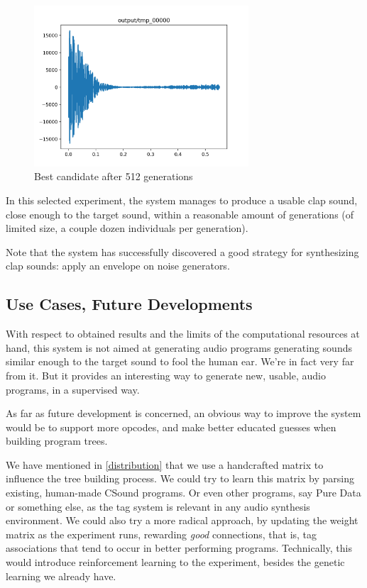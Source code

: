 \documentclass{article}
\begin{document}
\begin{figure}[H]
  \centering
  \includegraphics[width=8cm]{wav_clap_gen}
  \caption{Best candidate after 512 generations}
\end{figure}

In this selected experiment, the system manages to produce a usable clap sound, close enough to the target sound, within a reasonable amount of generations (of limited size, a couple dozen individuals per generation).

Note that the system has successfully discovered a good strategy for synthesizing clap sounds: apply an envelope on noise generators.

\subsection{Use Cases, Future Developments}

With respect to obtained results and the limits of the computational resources at hand, this system is not aimed at generating audio programs generating sounds similar enough to the target sound to fool the human ear. We're in fact very far from it. But it provides an interesting way to generate new, usable, audio programs, in a supervised way.

As far as future development is concerned, an obvious way to improve the system would be to support more opcodes, and make better educated guesses when building program trees.

We have mentioned in \ref{distribution} that we use a handcrafted matrix to influence the tree building process. We could try to learn this matrix by parsing existing, human-made CSound programs. Or even other programs, say Pure Data or something else, as the tag system is relevant in any audio synthesis environment. We could also try a more radical approach, by updating the weight matrix as the experiment runs, rewarding \textit{good} connections, that is, tag associations that tend to occur in better performing programs. Technically, this would introduce reinforcement learning to the experiment, besides the genetic learning we already have.
\end{document}
